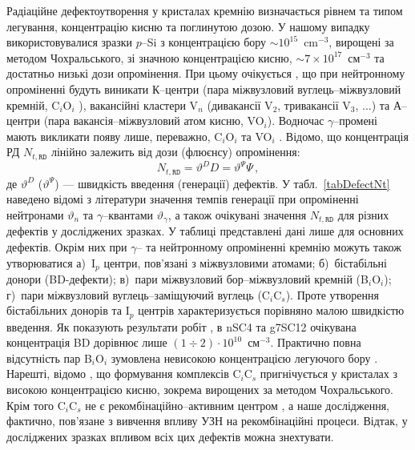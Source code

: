 Радіаційне  дефектоутворення у кристалах кремнію
визначається рівнем та типом легування, концентрацію кисню та поглинутою дозою.
У нашому випадку використовувалися зразки $p$--Si з концентрацією бору $\sim10^{15}$~cm$^{-3}$,
вирощені за методом Чохральського, зі значною концентрацією
кисню, $\sim7\times10^{17}$~см$^{-3}$ та достатньо низькі дози опромінення.
При цьому очікується \cite{n:long,n:gamma,Moll:PhD}, що при нейтронному опроміненні будуть виникати
К--центри (пара міжвузловий вуглець--міжвузловий кремній, C$_i$O$_i$ ),
вакансійні кластери V$_n$ (дивакансії V$_2$, тривакансії V$_3$, ...) та
А--центри (пара вакансія--міжвузловий атом кисню, VO$_i$).
Водночас $\gamma$--промені мають викликати появу лише, переважно, C$_i$O$_i$ та VO$_i$ \cite{gamma:Stahl,Moll:PhD,gamma:Kolkr,A:Caracas}.
Відомо, що концентрація РД $N_{t,\mathtt{RD}}$ лінійно залежить від дози (флюєнсу) опромінення:
\begin{equation}
\label{eqNtRD}
    N_{t,\mathtt{RD}}=\vartheta^{D} D=\vartheta^{\Psi}\Psi \,,
\end{equation}
де $\vartheta^{D}$ ($\vartheta^{\Psi}$) --- швидкість введення (генерації) дефектів.
У табл.~\ref{tabDefectNt} наведено відомі з літератури
значення темпів генерації при опроміненні нейтронами $\vartheta_n$ та $\gamma$--квантами $\vartheta_\gamma$, а також
очікувані значення $N_{t,\mathtt{RD}}$ для різних дефектів у досліджених зразках.
У таблиці представлені дані лише для основних дефектів.
Окрім них при $\gamma$-- та нейтронному опроміненні кремнію можуть також утворюватися
а)~I$_p$ центри, пов'язані з міжвузловими атомами;
б)~бістабільні донори (BD-дефекти);
в)~пари міжвузловий бор--міжвузловий кремній (B$_i$O$_i$);
г)~пари міжвузловий вуглець--заміщуючий вуглець (C$_i$C$_s$).
Проте утворення бістабільних донорів та I$_p$ центрів характеризується порівняно малою швидкістю введення.
Як показують результати робіт \cite{n:gamma,BD:Fret}, в nSC4 та g7SC12 очікувана
концентрація BD дорівнює лише $(1\div2)\cdot10^{10}$~см$^{-3}$.
Практично повна відсутність пар B$_i$O$_i$ зумовлена невисокою концентрацією легуючого бору \cite{SiIntDef}.
Нарешті, відомо \cite{gamma:Kolkr,gamma:Stahl,n:long}, що формування комплексів C$_i$C$_s$ пригнічується у кристалах
з високою концентрацією кисню, зокрема вирощених за методом Чохральського.
Крім того  C$_i$C$_s$ не є рекомбінаційно--активним центром \cite{CiCs:Song}, а наше дослідження,
фактично, пов'язане з вивчення впливу УЗН на рекомбінаційні процеси.
Відтак, у досліджених зразках впливом всіх цих дефектів можна знехтувати.



